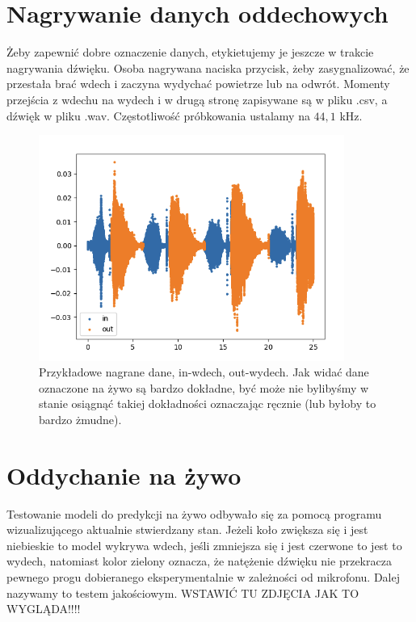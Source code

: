 \documentclass[polish]{article}
\begin{document}
\section{Nagrywanie danych oddechowych}
Żeby zapewnić dobre oznaczenie danych, etykietujemy je jeszcze w trakcie nagrywania dźwięku. 
Osoba nagrywana naciska przycisk, żeby zasygnalizować, że przestała brać wdech i zaczyna wydychać 
powietrze lub na odwrót. Momenty przejścia z wdechu na wydech i w drugą stronę zapisywane są w pliku
.csv, a dźwięk w pliku .wav. Częstotliwość próbkowania ustalamy na $44,1$ kHz.
\begin{figure}[H]
	\centering
	\includegraphics[width=10cm]{nagrywanie}
	\caption{Przykładowe nagrane dane, in-wdech, out-wydech. Jak widać dane oznaczone na żywo są bardzo dokładne, być może nie bylibyśmy w stanie osiągnąć takiej
dokładności oznaczając ręcznie (lub byłoby to bardzo żmudne).}
\end{figure}
\section{Oddychanie na żywo}
Testowanie modeli do predykcji na żywo odbywało się za pomocą programu wizualizującego aktualnie
stwierdzany stan. Jeżeli koło zwiększa się i jest niebieskie to model wykrywa wdech, jeśli zmniejsza się i jest
czerwone to jest to wydech, natomiast kolor zielony oznacza, że natężenie dźwięku nie przekracza pewnego 
progu dobieranego eksperymentalnie w zależności od mikrofonu.
Dalej nazywamy to testem jakościowym. WSTAWIĆ TU ZDJĘCIA JAK TO WYGLĄDA!!!!
\end{document}
